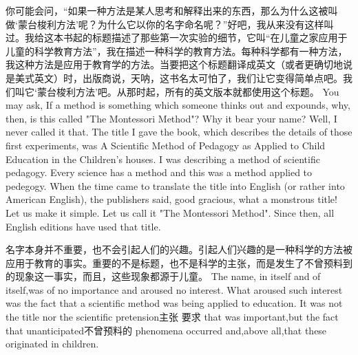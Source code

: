 \documentclass[lang=cn,10pt]{elegantbook}
\begin{document}
\begin{tcolorbox}[title=译文,
colback=red!5!white,
colframe=red!75!black,
fonttitle=\bfseries]
你可能会问，“如果一种方法是某人思考和解释出来的东西，那么为什么这被叫做‘蒙台梭利方法’呢？为什么它以你的名字命名呢？”好吧，我从来没有这样叫过。我给这本书起的标题描述了那些第一次实验的细节，它叫“在儿童之家应用于儿童的科学教育方法”，我在描述一种科学的教育方法。每种科学都有一种方法，我这种方法是应用于教育学的方法。当要把这个标题翻译成英文（或者更确切地说是美式英文）时，出版商说，天呐，这书名太可怕了，我们让它变得简单点吧。我们叫它‘蒙台梭利方法’吧。从那时起，所有的英文版本就都使用这个标题。
You may ask, If a method is something which someone thinks out and expounds, why, then, is this called "The Montessori Method"? Why it bear your name? Well, I never called it that. The title I gave the book, which describes the details of those first experiments, was A Scientific Method of Pedagogy as Applied to Child Education in the Children's houses. I was describing a method of scientific pedagogy. Every science has a method and this was a method applied to pedegogy. When the time came to translate the title into English (or rather into American English), the publishers said, good gracious, what a monstrous title! Let us make it simple. Let us call it "The Montessori Method". Since then, all English editions have used that title.
\end{tcolorbox}

\begin{tcolorbox}[title=译文,
colback=red!5!white,
colframe=red!75!black,
fonttitle=\bfseries]
名字本身并不重要，也不会引起人们的兴趣。引起人们兴趣的是一种科学的方法被应用于教育的事实。重要的不是标题，也不是科学的主张，而是发生了不曾预料到的现象这一事实，而且，这些现象都源于儿童。
The name, in itself and of itself,was of no importance and aroused no interest. What aroused such interest was the fact that a scientific method was being applied to education. It was not the title nor the scientific pretension主张 要求 that was important,but the fact that unanticipated不曾预料的 phenomena occurred and,above all,that these originated in children.
\end{tcolorbox}
\end{document}
